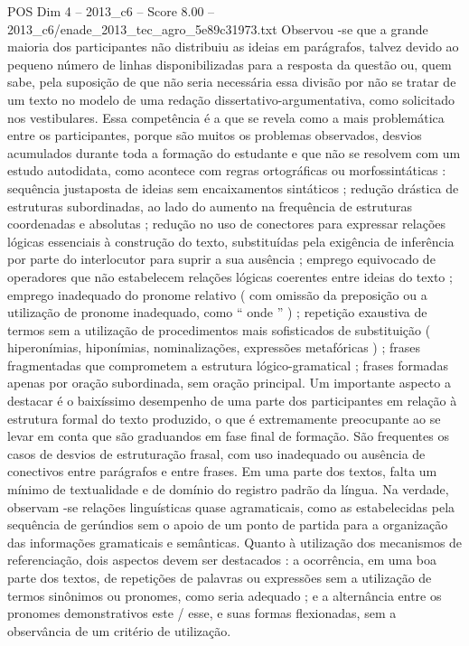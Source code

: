 \begin{textsample}{POS Dim 4 – 2013\_c6 – Score 8.00 – 2013\_c6/enade\_2013\_tec\_agro\_5e89c31973.txt}
Observou -se que a grande maioria dos participantes não distribuiu as ideias em parágrafos, talvez devido ao pequeno número de linhas disponibilizadas para a resposta da questão ou, quem sabe, pela suposição de que não seria necessária essa divisão por não se tratar de um texto no modelo de uma redação dissertativo-argumentativa, como solicitado nos vestibulares.
Essa competência é a que se revela como a mais problemática entre os participantes, porque são muitos os problemas observados, desvios acumulados durante toda a formação do estudante e que não se resolvem com um estudo autodidata, como acontece com regras ortográficas ou morfossintáticas : sequência justaposta de ideias sem encaixamentos sintáticos ; redução drástica de estruturas subordinadas, ao lado do aumento na frequência de estruturas coordenadas e absolutas ; redução no uso de conectores para expressar relações lógicas essenciais à construção do texto, substituídas pela exigência de inferência por parte do interlocutor para suprir a sua ausência ; emprego equivocado de operadores que não estabelecem relações lógicas coerentes entre ideias do texto ; emprego inadequado do pronome relativo ( com omissão da preposição ou a utilização de pronome inadequado, como “ onde ” ) ; repetição exaustiva de termos sem a utilização de procedimentos mais sofisticados de substituição ( hiperonímias, hiponímias, nominalizações, expressões metafóricas ) ; frases fragmentadas que comprometem a estrutura lógico-gramatical ; frases formadas apenas por oração subordinada, sem oração principal.
Um importante aspecto a destacar é o baixíssimo desempenho de uma parte dos participantes em relação à estrutura formal do texto produzido, o que é extremamente preocupante ao se levar em conta que são graduandos em fase final de formação.
São frequentes os casos de desvios de estruturação frasal, com uso inadequado ou ausência de conectivos entre parágrafos e entre frases.
Em uma parte dos textos, falta um mínimo de textualidade e de domínio do registro padrão da língua.
Na verdade, observam -se relações linguísticas quase agramaticais, como as estabelecidas pela sequência de gerúndios sem o apoio de um ponto de partida para a organização das informações gramaticais e semânticas.
Quanto à utilização dos mecanismos de referenciação, dois aspectos devem ser destacados : a ocorrência, em uma boa parte dos textos, de repetições de palavras ou expressões sem a utilização de termos sinônimos ou pronomes, como seria adequado ; e a alternância entre os pronomes demonstrativos este / esse, e suas formas flexionadas, sem a observância de um critério de utilização.

\end{textsample}
